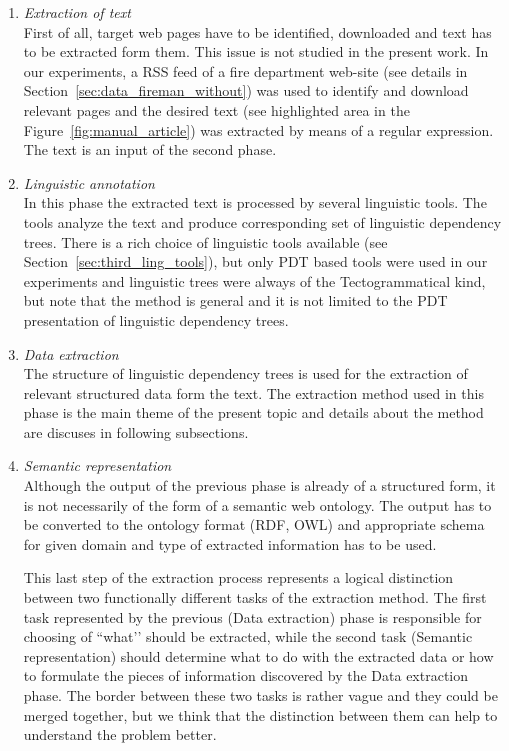 \begin{enumerate}
\item \emph{Extraction of text} \\ First of all, target web pages have to be identified, downloaded and text has to be extracted form them. This issue is not studied in the present work. In our experiments, a RSS feed of a fire department web-site (see details in Section~\ref{sec:data_fireman_without}) was used to identify and download relevant pages and the desired text (see highlighted area in the Figure~\ref{fig:manual_article}) was extracted by means of a regular expression. The text is an input of the second phase.

\item \emph{Linguistic annotation} \\ In this phase the extracted text is processed by several linguistic tools. The tools analyze the text and produce corresponding set of linguistic dependency trees. There is a rich choice of linguistic tools available (see Section~\ref{sec:third_ling_tools}), but only PDT based tools were used in our experiments and linguistic trees were always of the Tectogrammatical kind, but note that the method is general and it is not limited to the PDT presentation of linguistic dependency trees.

\item \emph{Data extraction} \\ The structure of linguistic dependency trees is used for the extraction of relevant structured data form the text. The extraction method used in this phase is the main theme of the present topic and details about the method are discuses in following subsections.

\item \emph{Semantic representation} \\ Although the output of the previous phase is already of a structured form, it is not necessarily of the form of a semantic web ontology. The output has to be converted to the ontology format (RDF, OWL) and appropriate schema for given domain and type of extracted information has to be used. 

This last step of the extraction process represents a logical distinction between two functionally different tasks of the extraction method. The first task represented by the previous (Data extraction) phase is responsible for choosing of ``what’’ should be extracted, while the second task (Semantic representation) should determine what to do with the extracted data or how to formulate the pieces of information discovered by the Data extraction phase. The border between these two tasks is rather vague and they could be merged together, but we think that the distinction between them can help to understand the problem better.



\end{enumerate}
